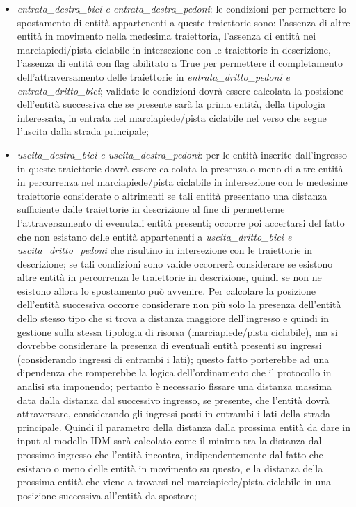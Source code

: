 \begin{enumerate}
\begin{enumerate}
\begin{itemize}
\item \textit{en\-tra\-ta\_des\-tra\_bi\-ci e en\-tra\-ta\_des\-tra\_pe\-do\-ni}: le condizioni per permettere lo spostamento di entità appartenenti a queste traiettorie sono: l'assenza di altre entità in movimento nella medesima traiettoria, l'assenza di entità nei marciapiedi/pista ciclabile in intersezione con le traiettorie in descrizione, l'assenza di entità con flag abilitato a True per permettere il completamento dell'attraversamento delle traiettorie in \textit{en\-tra\-ta\_drit\-to\_pe\-do\-ni e en\-tra\-ta\_drit\-to\_bi\-ci}; validate le condizioni dovrà essere calcolata la posizione dell'entità successiva che se presente sarà la prima entità, della tipologia interessata, in entrata nel marciapiede/pista ciclabile nel verso che segue l'uscita dalla strada principale;
\item \textit{usci\-ta\_des\-tra\_bi\-ci e usci\-ta\_des\-tra\_pe\-do\-ni}: per le entità inserite dall'ingresso in queste traiettorie dovrà essere calcolata la presenza o meno di altre entità in percorrenza nel marciapiede/pista ciclabile in intersezione con le medesime traiettorie considerate o altrimenti se tali entità presentano una distanza sufficiente dalle traiettorie in descrizione al fine di permetterne l'attraversamento di evenutali entità presenti; occorre poi accertarsi del fatto che non esistano delle entità appartenenti a \textit{usci\-ta\_drit\-to\_bi\-ci e usci\-ta\_drit\-to\_pe\-do\-ni} che risultino in intersezione con le traiettorie in descrizione; se tali condizioni sono valide occorrerà considerare se esistono altre entità in percorrenza le traiettorie in descrizione, quindi se non ne esistono allora lo spostamento può avvenire. Per calcolare la posizione dell'entità successiva occorre considerare non più solo la presenza dell'entità dello stesso tipo che si trova a distanza maggiore dell'ingresso e quindi in gestione sulla stessa tipologia di risorsa (marciapiede/pista ciclabile), ma si dovrebbe considerare la presenza di eventuali entità presenti su ingressi (considerando ingressi di entrambi i lati); questo fatto porterebbe ad una dipendenza che romperebbe la logica dell'ordinamento che il protocollo in analisi sta imponendo; pertanto è necessario fissare una distanza massima data dalla distanza dal successivo ingresso, se presente, che l'entità dovrà attraversare, considerando gli ingressi posti in entrambi i lati della strada principale. Quindi il parametro della distanza dalla prossima entità da dare in input al modello IDM sarà calcolato come il minimo tra la distanza dal prossimo ingresso che l'entità incontra, indipendentemente dal fatto che esistano o meno delle entità in movimento su questo, e la distanza della prossima entità che viene a trovarsi nel marciapiede/pista ciclabile in una posizione successiva all'entità da spostare; 

\end{itemize}
\end{enumerate}
\end{enumerate}
